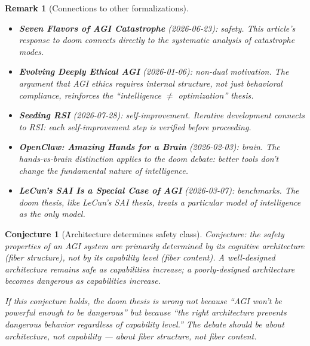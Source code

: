 \documentclass[11pt,a4paper]{article}
\newtheorem{remark}[definition]{Remark}
\newtheorem{conjecture}[definition]{Conjecture}
\begin{document}
\begin{remark}[Connections to other formalizations]
\begin{itemize}
\item \textbf{Seven Flavors of AGI Catastrophe} (2026-06-23): safety.
  This article's response to doom connects directly to the systematic
  analysis of catastrophe modes.
\item \textbf{Evolving Deeply Ethical AGI} (2026-01-06): non-dual
  motivation. The argument that AGI ethics requires internal structure,
  not just behavioral compliance, reinforces the ``intelligence $\neq$
  optimization'' thesis.
\item \textbf{Seeding RSI} (2026-07-28): self-improvement. Iterative
  development connects to RSI: each self-improvement step is verified
  before proceeding.
\item \textbf{OpenClaw: Amazing Hands for a Brain} (2026-02-03): brain.
  The hands-vs-brain distinction applies to the doom debate: better
  tools don't change the fundamental nature of intelligence.
\item \textbf{LeCun's SAI Is a Special Case of AGI} (2026-03-07):
  benchmarks. The doom thesis, like LeCun's SAI thesis, treats a
  particular model of intelligence as the only model.
\end{itemize}
\end{remark}

\begin{conjecture}[Architecture determines safety class]
Conjecture: the safety properties of an AGI system are primarily
determined by its cognitive architecture (fiber structure), not by its
capability level (fiber content). A well-designed architecture remains
safe as capabilities increase; a poorly-designed architecture becomes
dangerous as capabilities increase.

If this conjecture holds, the doom thesis is wrong not because ``AGI
won't be powerful enough to be dangerous'' but because ``the right
architecture prevents dangerous behavior regardless of capability
level.'' The debate should be about architecture, not capability ---
about fiber structure, not fiber content.
\end{conjecture}
\end{document}
